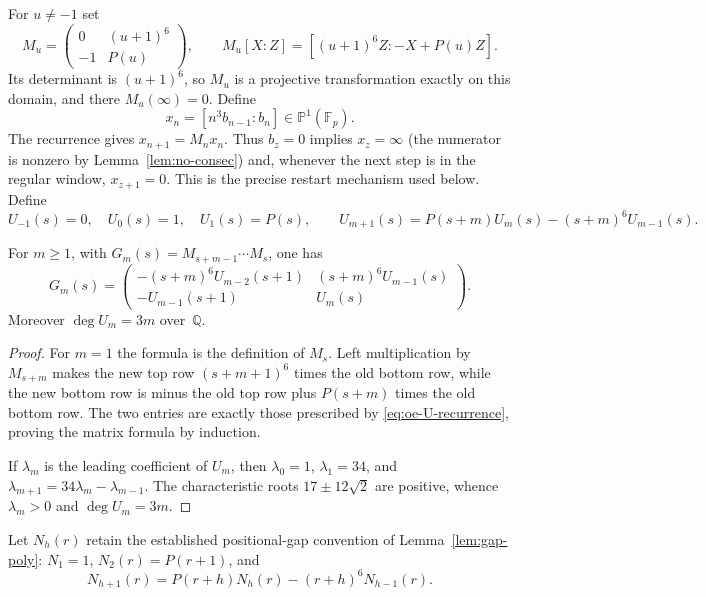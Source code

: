 For $u\ne-1$ set
\[
 M_u=\begin{pmatrix}0&(u+1)^6\\-1&P(u)\end{pmatrix},
 \qquad
 M_u[X:Z]=[(u+1)^6Z:-X+P(u)Z].
\]
Its determinant is $(u+1)^6$, so $M_u$ is a projective transformation
exactly on this domain, and there $M_u(\infty)=0$.  Define
\[
 x_n=[n^3b_{n-1}:b_n]\in\mathbb P^1(\mathbb F_p).
\]
The recurrence gives $x_{n+1}=M_nx_n$.  Thus $b_z=0$ implies
$x_z=\infty$ (the numerator is nonzero by Lemma~\ref{lem:no-consec}) and,
whenever the next step is in the regular window, $x_{z+1}=0$.  This is the
precise restart mechanism used below.  Define
\begin{equation}\label{eq:oe-U-recurrence}
 U_{-1}(s)=0,\quad U_0(s)=1,\quad U_1(s)=P(s),\qquad
 U_{m+1}(s)=P(s+m)U_m(s)-(s+m)^6U_{m-1}(s).
\end{equation}

\begin{lemma}\label{lem:oe-transfer-product}
For $m\ge1$, with
$G_m(s)=M_{s+m-1}\cdots M_s$, one has
\begin{equation}\label{eq:oe-transfer-product}
G_m(s)=
\begin{pmatrix}
 -(s+m)^6U_{m-2}(s+1)&(s+m)^6U_{m-1}(s)\\
 -U_{m-1}(s+1)&U_m(s)
\end{pmatrix}.
\end{equation}
Moreover $\deg U_m=3m$ over~$\mathbb Q$.
\end{lemma}

\begin{proof}
For $m=1$ the formula is the definition of $M_s$.  Left multiplication by
$M_{s+m}$ makes the new top row $(s+m+1)^6$ times the old bottom row, while
the new bottom row is minus the old top row plus $P(s+m)$ times the old
bottom row.  The two entries are exactly those prescribed by
\eqref{eq:oe-U-recurrence}, proving the matrix formula by induction.

If $\lambda_m$ is the leading coefficient of $U_m$, then
$\lambda_0=1$, $\lambda_1=34$, and
$\lambda_{m+1}=34\lambda_m-\lambda_{m-1}$.  The characteristic roots
$17\pm12\sqrt2$ are positive, whence $\lambda_m>0$ and $\deg U_m=3m$.
\end{proof}

Let $N_h(r)$ retain the established positional-gap convention of
Lemma~\ref{lem:gap-poly}: $N_1=1$, $N_2(r)=P(r+1)$, and
\[
 N_{h+1}(r)=P(r+h)N_h(r)-(r+h)^6N_{h-1}(r).
\]

